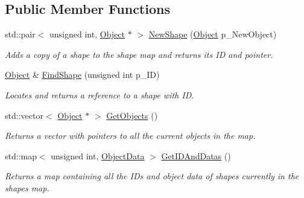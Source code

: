 \subsection*{Public Member Functions}
\begin{DoxyCompactItemize}
\item 
\mbox{\label{class_shapes_a507aab492a4840275d9cc6dea090d880}} 
std\+::pair$<$ unsigned int, \hyperlink{class_object}{Object} $\ast$ $>$ \hyperlink{class_shapes_a507aab492a4840275d9cc6dea090d880}{New\+Shape} (\hyperlink{class_object}{Object} p\+\_\+\+New\+Object)
\begin{DoxyCompactList}\small\item\em Adds a copy of a shape to the shape map and returns its ID and pointer. \end{DoxyCompactList}\item 
\mbox{\label{class_shapes_a95aba282963cca12a01ee17066af9297}} 
\hyperlink{class_object}{Object} \& \hyperlink{class_shapes_a95aba282963cca12a01ee17066af9297}{Find\+Shape} (unsigned int p\+\_\+\+ID)
\begin{DoxyCompactList}\small\item\em Locates and returns a reference to a shape with ID. \end{DoxyCompactList}\item 
\mbox{\label{class_shapes_a8651d6e746556b68623156dcce5202bc}} 
std\+::vector$<$ \hyperlink{class_object}{Object} $\ast$ $>$ \hyperlink{class_shapes_a8651d6e746556b68623156dcce5202bc}{Get\+Objects} ()
\begin{DoxyCompactList}\small\item\em Returns a vector with pointers to all the current objects in the map. \end{DoxyCompactList}\item 
\mbox{\label{class_shapes_ab1d661641f51d136fd840367562580ef}} 
std\+::map$<$ unsigned int, \hyperlink{class_object_data}{Object\+Data} $>$ \hyperlink{class_shapes_ab1d661641f51d136fd840367562580ef}{Get\+I\+D\+And\+Datas} ()
\begin{DoxyCompactList}\small\item\em Returns a map containing all the I\+Ds and object data of shapes currently in the shapes map. \end{DoxyCompactList}\item 

\end{DoxyCompactItemize}
